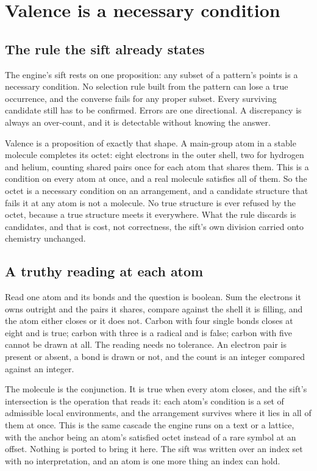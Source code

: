 \chapter{Valence is a necessary condition}

\section{The rule the sift already states}

The engine's sift rests on one proposition: any subset of a pattern's points is a necessary
condition. No selection rule built from the pattern can lose a true occurrence, and the converse
fails for any proper subset. Every surviving candidate still has to be confirmed. Errors are one
directional. A discrepancy is always an over-count, and it is detectable without knowing the answer.

Valence is a proposition of exactly that shape. A main-group atom in a stable molecule completes its
octet: eight electrons in the outer shell, two for hydrogen and helium, counting shared pairs once
for each atom that shares them. This is a condition on every atom at once, and a real molecule
satisfies all of them. So the octet is a necessary condition on an arrangement, and a candidate
structure that fails it at any atom is not a molecule. No true structure is ever refused by the
octet, because a true structure meets it everywhere. What the rule discards is candidates, and that
is cost, not correctness, the sift's own division carried onto chemistry unchanged.

\section{A truthy reading at each atom}

Read one atom and its bonds and the question is boolean. Sum the electrons it owns outright and the
pairs it shares, compare against the shell it is filling, and the atom either closes or it does not.
Carbon with four single bonds closes at eight and is true; carbon with three is a radical and is
false; carbon with five cannot be drawn at all. The reading needs no tolerance. An electron pair is
present or absent, a bond is drawn or not, and the count is an integer compared against an integer.

The molecule is the conjunction. It is true when every atom closes, and the sift's intersection is
the operation that reads it: each atom's condition is a set of admissible local environments, and the
arrangement survives where it lies in all of them at once. This is the same cascade the engine runs
on a text or a lattice, with the anchor being an atom's satisfied octet instead of a rare symbol at
an offset. Nothing is ported to bring it here. The sift was written over an index set with no
interpretation, and an atom is one more thing an index can hold.


